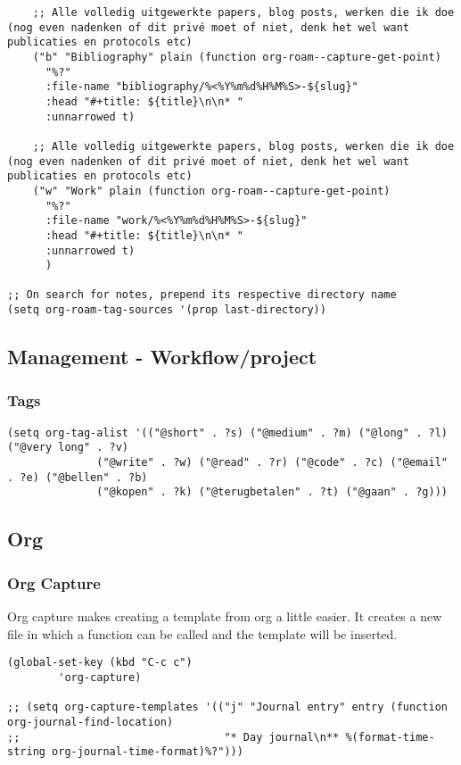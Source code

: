 \documentclass[11pt]{article}
\begin{document}
\begin{verbatim}
	;; Alle volledig uitgewerkte papers, blog posts, werken die ik doe (nog even nadenken of dit privé moet of niet, denk het wel want publicaties en protocols etc)
	("b" "Bibliography" plain (function org-roam--capture-get-point)
	  "%?"
	  :file-name "bibliography/%<%Y%m%d%H%M%S>-${slug}"
	  :head "#+title: ${title}\n\n* "
	  :unnarrowed t)

	;; Alle volledig uitgewerkte papers, blog posts, werken die ik doe (nog even nadenken of dit privé moet of niet, denk het wel want publicaties en protocols etc)
	("w" "Work" plain (function org-roam--capture-get-point)
	  "%?"
	  :file-name "work/%<%Y%m%d%H%M%S>-${slug}"
	  :head "#+title: ${title}\n\n* "
	  :unnarrowed t)
      )

;; On search for notes, prepend its respective directory name
(setq org-roam-tag-sources '(prop last-directory))
\end{verbatim}
\subsection{Management - Workflow/project}
\label{sec:orgaab7dd8}
\subsubsection{Tags}
\label{sec:orgfd19d3f}
\begin{verbatim}
(setq org-tag-alist '(("@short" . ?s) ("@medium" . ?m) ("@long" . ?l) ("@very long" . ?v)
		      ("@write" . ?w) ("@read" . ?r) ("@code" . ?c) ("@email" . ?e) ("@bellen" . ?b)
		      ("@kopen" . ?k) ("@terugbetalen" . ?t) ("@gaan" . ?g)))
\end{verbatim}
\subsection{Org}
\label{sec:orgae9cddb}
\subsubsection{Org Capture}
\label{sec:orgb26c7d8}
Org capture makes creating a template from org a little easier. It creates a new file in which a function can be called and the template will be inserted.
\begin{verbatim}
(global-set-key (kbd "C-c c")
		'org-capture)

;; (setq org-capture-templates '(("j" "Journal entry" entry (function org-journal-find-location)
;;                                "* Day journal\n** %(format-time-string org-journal-time-format)%?")))
\end{verbatim}
\end{document}
